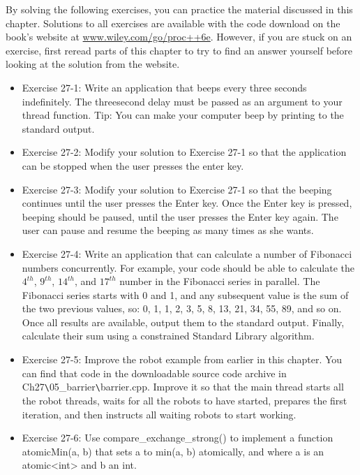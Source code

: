 By solving the following exercises, you can practice the material discussed in this chapter. Solutions to all exercises are available with the code download on the book’s website at \url{www.wiley.com/go/proc++6e}. However, if you are stuck on an exercise, first reread parts of this chapter to try to find an answer yourself before looking at the solution from the website.

\begin{itemize}
\item
Exercise 27-1: Write an application that beeps every three seconds indefinitely. The threesecond delay must be passed as an argument to your thread function. Tip: You can make your computer beep by printing \a to the standard output.

\item
Exercise 27-2: Modify your solution to Exercise 27-1 so that the application can be stopped when the user presses the enter key.

\item
Exercise 27-3: Modify your solution to Exercise 27-1 so that the beeping continues until the user presses the Enter key. Once the Enter key is pressed, beeping should be paused, until the user presses the Enter key again. The user can pause and resume the beeping as many times as she wants.

\item
Exercise 27-4: Write an application that can calculate a number of Fibonacci numbers concurrently. For example, your code should be able to calculate the $4^{th}$, $9^{th}$, $14^{th}$, and $17^{th}$ number in the Fibonacci series in parallel. The Fibonacci series starts with 0 and 1, and any subsequent value is the sum of the two previous values, so: 0, 1, 1, 2, 3, 5, 8, 13, 21, 34, 55, 89, and so on. Once all results are available, output them to the standard output. Finally, calculate their sum using a constrained Standard Library algorithm.

\item
Exercise 27-5: Improve the robot example from earlier in this chapter. You can find that code in the downloadable source code archive in Ch27\verb|\|05\_barrier\verb|\|barrier.cpp. Improve it so that the main thread starts all the robot threads, waits for all the robots to have started, prepares the first iteration, and then instructs all waiting robots to start working.

\item
Exercise 27-6: Use compare\_exchange\_strong() to implement a function atomicMin(a, b) that sets a to min(a, b) atomically, and where a is an atomic<int> and b an int.
\end{itemize}








